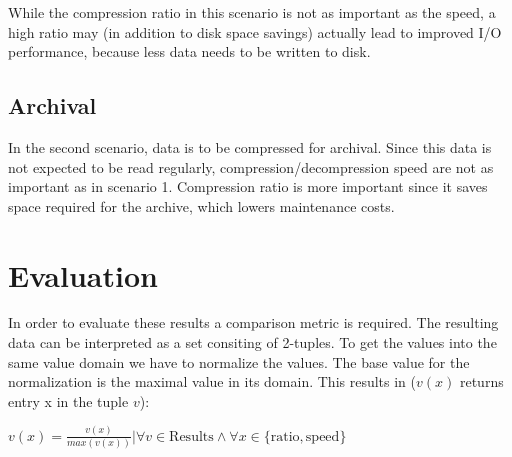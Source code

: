 \documentclass[
	12pt,
	a4paper,
	BCOR10mm,
	DIV14,
	listof=totoc,
	bibliography=totoc,
	headsepline
]{scrreprt}
\begin{document}
While the compression ratio in this scenario is not as important as the speed, a high ratio may (in addition to disk space savings) actually lead to improved I/O performance, because less data needs to be written to disk.

\subsection{Archival}

In the second scenario, data is to be compressed for archival. Since this data is not expected to be read regularly, compression/decompression speed are not as important as in scenario 1. Compression ratio is more important since it saves space required for the archive, which lowers maintenance costs.

\section{Evaluation}
In order to evaluate these results a comparison metric is required.
The resulting data can be interpreted as a set consiting of 2-tuples.
To get the values into the same value domain we have to normalize the values.
The base value for the normalization is the maximal value in its domain.
This results in (\(v(x)\) returns entry x in the tuple \(v\)):
\begin{center}
	\(
	   v(x) = \frac{v(x)}{max(v(x))}|\forall v \in \text{Results} \land \forall x \in \{\text{ratio}, \text{speed}\}
	\)
\end{center}
\end{document}
